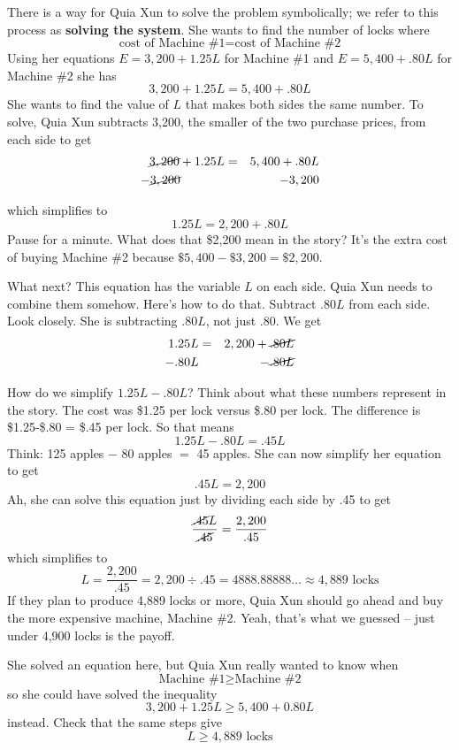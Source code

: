 There is a way for Quia Xun to solve the problem symbolically; we refer to this process as \textbf{solving the system}.  She wants to find the number of locks where 
$$\text{cost of Machine \#1} = \text{cost of Machine \#2}$$
Using her equations $E  =3,200 + 1.25L$ for Machine \#1 and $E  =5,400 + .80L$ for Machine \#2 she has
$$3,200 + 1.25L=5,400 + .80L$$
She wants to find the value of $L$ that makes both sides the same number.  To solve, Quia Xun subtracts 3,200, the smaller of the two purchase prices, from each side to get
  \begin{eqnarray*}
\cancel{3,200} + 1.25L & = & 5,400 + .80L \\
-\cancel{3,200} \hspace{.5 in} & & -3,200  \\ %
\end{eqnarray*}
\vspace{-.5in} %

\noindent which simplifies to $$1.25L = 2,200 + .80L$$
Pause for a minute.  What does that \$2,200 mean in the story?  It's the extra cost of buying Machine \#2 because $\$5,400 - \$3,200 = \$2,200$.  

What next?  This equation has the variable $L$ on each side.  Quia Xun needs to combine them somehow.  Here's how to do that.  Subtract $.80L$ from each side. Look closely.  She is subtracting $.80L$, not just $.80$.  We get
\begin{eqnarray*}
1.25L & = & 2,200 + \cancel{.80L}\\
-.80L & & \hspace{.4in}-\cancel{.80L}  \\ %
\end{eqnarray*}
\vspace{-.5in} %

\noindent How do we simplify $1.25L-.80L$?  Think about what these numbers represent in the story.  The cost was \$1.25 per lock versus \$.80 per lock.   The difference is \$1.25-\$.80 = \$.45 per lock.  So that means
$$1.25L -.80L = .45L$$ Think:  125 apples $-$ 80 apples $=$ 45 apples.  %
She can now simplify her equation to get
$$.45L = 2,200$$
Ah, she can solve this equation just by dividing each side by .45 to get
$$\frac{\cancel{.45}L}{\cancel{.45}}= \frac{2,200}{.45}$$
which simplifies to $$L = \frac{2,200}{.45}= 2,200 \div .45 = 4888.88888\ldots \approx 4,889 \text{ locks}$$
If they plan to produce 4,889 locks or more, Quia Xun should go ahead and buy the more expensive machine, Machine \#2. Yeah, that's what we guessed -- just under 4,900 locks is the payoff.

She solved an equation here, but Quia Xun really wanted to know when $$\text{Machine \#1} \ge \text{Machine \#2}$$
so she could have solved the inequality $$3,200 + 1.25L \ge 5,400 + 0.80L$$
instead.  
Check that the same steps give 
$$L \ge 4,889 \text{ locks}$$

 